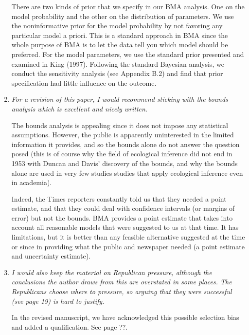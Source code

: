 \documentclass[11pt]{article}
\begin{document}
\begin{enumerate}
  There are two kinds of prior that we specify in our BMA analysis.
  One on the model probability and the other on the distribution of
  parameters. We use the noninformative prior for the model
  probability by not favoring any particular model a priori. This is a
  standard approach in BMA since the whole purpose of BMA is to let
  the data tell you which model should be preferred. For the model
  parameters, we use the standard prior presented and examined in King
  (1997). Following the standard Bayesian analysis, we conduct the
  sensitivity analysis (see Appendix B.2) and find that prior
  specification had little influence on the outcome.
  
\item {\it For a revision of this paper, I would recommend sticking
    with the bounds analysis which is excellent and nicely written.}
  
  The bounds analysis is appealing since it does not impose any
  statistical assumptions.  However, the public is apparently
  uninterested in the limited information it provides, and so the
  bounds alone do not answer the question posed (this is of course why
  the field of ecological inference did not end in 1953 with Duncan
  and Davis' discovery of the bounds, and why the bounds alone are
  used in very few studies studies that apply ecological inference
  even in academia).  
  
  Indeed, the Times reporters constantly told us that they needed a
  point estimate, and that they could deal with confidence intervals
  (or margins of error) but not the bounds.  BMA provides a point
  estimate that takes into account all reasonable models that were
  suggested to us at that time.  It has limitations, but it is better
  than any feasible alternative suggested at the time or since in
  providing what the public and newspaper needed (a point estimate and
  uncertainty estimate). 
 
\item {\it I would also keep the material on Republican pressure,
    although the conclusions the author draws from this are overstated
    in some places.  The Republicans choose where to pressure, so
    arguing that they were successful (see page 19) is hard to
    justify.}
  
  In the revised manuscript, we have acknowledged this possible
  selection bias and added a qualification. See page ??.


\end{enumerate}
\end{document}
